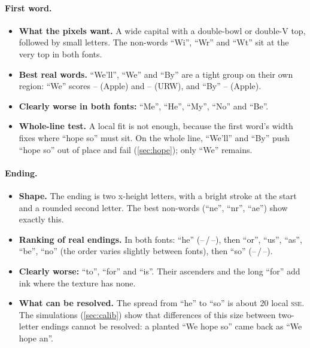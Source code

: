 \documentclass[10pt,a4paper]{article}
\providecommand{\LocFBWe}{--}\providecommand{\LocFBestB}{--}\providecommand{\LocFABy}{--}\providecommand{\LocFAWe}{--}
\providecommand{\LocEAHe}{--}\providecommand{\LocEBHe}{--}\providecommand{\LocEASo}{--}\providecommand{\LocEBSo}{--}
\newcommand{\q}[1]{``#1''}
\newcommand{\SSE}{\textsc{sse}}
\begin{document}
\paragraph{First word.}
\begin{itemize}
\item \textbf{What the pixels want.} A wide capital with a double-bowl or double-V top, followed by small letters.
The non-words \q{Wi}, \q{Wr} and \q{Wt} sit at the very top in both fonts.
\item \textbf{Best real words.} \q{We'll}, \q{We} and \q{By} are a tight group on their own region: \q{We} scores
\LocFAWe{} (Apple) and \LocFBWe{} (URW), and \q{By} \LocFABy{} (Apple).
\item \textbf{Clearly worse in both fonts:} \q{Me}, \q{He}, \q{My}, \q{No} and \q{Be}.
\item \textbf{Whole-line test.} A local fit is not enough, because the first word's width fixes where \q{hope so} must
sit. On the whole line, \q{We'll} and \q{By} push \q{hope so} out of place and fail (\cref{sec:hope}); only \q{We}
remains.
\end{itemize}

\paragraph{Ending.}
\begin{itemize}
\item \textbf{Shape.} The ending is two x-height letters, with a bright stroke at the start and a rounded second
letter. The best non-words (\q{ne}, \q{nr}, \q{ae}) show exactly this.
\item \textbf{Ranking of real endings.} In both fonts: \q{he} (\LocEAHe\,/\,\LocEBHe), then \q{or}, \q{us}, \q{as},
\q{be}, \q{no} (the order varies slightly between fonts), then \q{so} (\LocEASo\,/\,\LocEBSo).
\item \textbf{Clearly worse:} \q{to}, \q{for} and \q{is}. Their ascenders and the long \q{for} add ink where the
texture has none.
\item \textbf{What can be resolved.} The spread from \q{he} to \q{so} is about 20 local \SSE. The simulations
(\cref{sec:calib}) show that differences of this size between two-letter endings cannot be resolved: a planted
\q{We hope so} came back as \q{We hope an}.
\end{itemize}
\end{document}

